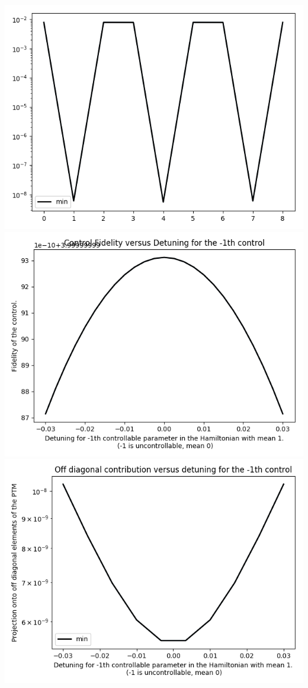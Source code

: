 \documentclass{article}
\begin{document}
\begin{center}
\includegraphics[scale=.9]{report_pickled_controls8/control_dpn_all}
\includegraphics[scale=.9]{control_fid_0}
\includegraphics[scale=.9]{off_diag_0}

\end{center}
\end{document}
